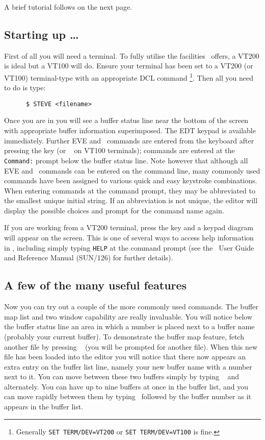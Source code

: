 A brief tutorial follows on the next page.

\newpage

\subsection*{Starting up \ldots}
First of all you will need a terminal. To fully utilise the facilities \STEve\
offers, a VT200 is ideal but a VT100 will do. Ensure your terminal has been set
to a VT200 (or VT100) terminal-type with an appropriate DCL command \footnote{
Generally {\tt SET TERM/DEV=VT200} or {\tt SET TERM/DEV=VT100} is fine.}. Then
all you need to do is type:

\begin{verbatim}
      $ STEVE <filename>
\end{verbatim}

Once you are in you will see a buffer status line near the bottom of the screen
with appropriate buffer information superimposed. The EDT keypad is available
immediately. Further EVE and \STEve\ commands are entered from the keyboard
after pressing the \keyname{Do} key (or \gold\ \keyname{KP7} on VT100
terminals); commands are entered at the {\tt Command:} prompt below the buffer
status line. Note however that although all EVE and \STEve\ commands can be
entered on the command line, many commonly used commands have been assigned to
various quick and easy keystroke combinations. When entering  commands at the
command prompt, they may be abbreviated to the smallest unique initial string.
If an abbreviation is not unique, the editor will display the possible choices
and prompt for the command name again.

If you are working from a VT200 terminal, press the  key and a
keypad diagram will appear on the screen. This is one of several ways to access
help information in \STEve, including simply typing {\tt HELP} at the command
prompt (see the \STEve\ User Guide and Reference Manual (SUN/126) for
further details).

\subsection*{A few of the many useful features}
Now you can try out a couple of the more commonly used commands. The buffer map
list and two window capability are really invaluable. You will notice below the
buffer status line an area in which a number is placed next to a buffer name
(probably your current buffer). To demonstrate the buffer map feature, fetch
another file by pressing \gold\ \keyname{G} (you will be prompted for
another file). When this new file has been loaded into the editor you will
notice that there now appears an extra entry on the buffer list line, namely
your new buffer name with a number next to it. You can move between these two
buffers simply by typing \gold\ \keyname{1} and \gold\ \keyname{2} alternately.
You can have up to nine buffers at once in the buffer list, and you can move
rapidly between them by typing \gold\ followed by the buffer number as it
appears in the buffer list.

